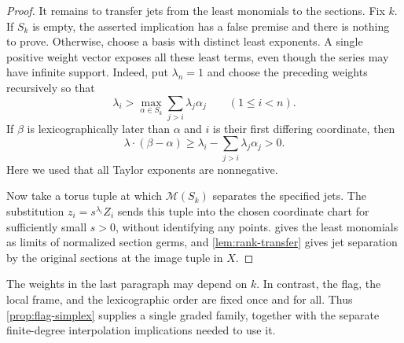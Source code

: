 \begin{proof}
It remains to transfer jets from the least monomials to the sections. Fix $k$. If $S_k$ is empty, the asserted implication has a false premise and there is nothing to prove. Otherwise, choose a basis with distinct least exponents. A single positive weight vector exposes all these least terms, even though the series may have infinite support. Indeed, put $\lambda_n=1$ and choose the preceding weights recursively so that
\begin{equation}\label{eq:lex-exposing-weights}
 \lambda_i>
 \max_{\alpha\in S_k}\sum_{j>i}\lambda_j\alpha_j
 \qquad(1\leq i<n).
\end{equation}
If $\beta$ is lexicographically later than $\alpha$ and $i$ is their first differing coordinate, then
\[
 \lambda\cdot(\beta-\alpha)
 \geq\lambda_i-\sum_{j>i}\lambda_j\alpha_j>0.
\]
Here we used that all Taylor exponents are nonnegative.

Now take a torus tuple at which $\mathcal{M}(S_k)$ separates the specified jets. The substitution $z_i=s^{\lambda_i}Z_i$ sends this tuple into the chosen coordinate chart for sufficiently small $s>0$, without identifying any points.  gives the least monomials as limits of normalized section germs, and \cref{lem:rank-transfer} gives jet separation by the original sections at the image tuple in $X$.
\end{proof}

The weights in the last paragraph may depend on $k$. In contrast, the flag, the local frame, and the lexicographic order are fixed once and for all. Thus \cref{prop:flag-simplex} supplies a single graded family, together with the separate finite-degree interpolation implications needed to use it.
